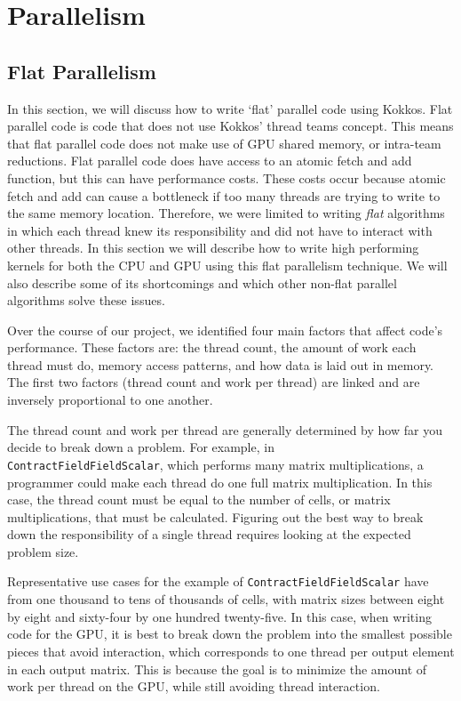\chapter{Parallelism}

\section{Flat Parallelism}
In this section, we will discuss how to write `flat' parallel code using Kokkos. 
Flat parallel code is code that does not use Kokkos' thread teams concept. This means
that flat parallel code does not make use of GPU shared memory, or intra-team reductions.
Flat parallel code does have access to an atomic fetch and add function, 
but this can have performance costs. These costs occur because atomic fetch and add can 
cause a bottleneck if too many threads
are trying to write to the same memory location. Therefore, we were limited to
writing \emph{flat} algorithms in which each thread knew its responsibility and did not
have to interact with other threads. In this section we will describe how to write
high performing kernels for both the CPU and GPU using this flat parallelism
technique. We will also describe some of its shortcomings and which other
non-flat parallel algorithms solve these issues.

Over the course of our project, we identified four main factors that affect
code's performance. These factors are: the thread count, the amount of work
each thread must do, memory access patterns, and how data is laid out in memory.
The first two factors (thread count and work per thread) are linked and are 
inversely proportional to one another. 

The thread count and work per thread are generally determined by how far you
decide to break down a problem. For example, in \\ \texttt{ContractFieldFieldScalar}, which performs
many matrix multiplications, a programmer could make each thread do one full matrix
multiplication. In this case, the thread count must be equal to the number of cells,
or matrix multiplications, that must be calculated. Figuring out the best way
to break down the responsibility of a single thread requires looking at the
expected problem size. 

Representative use cases for the example of
\texttt{ContractFieldFieldScalar} have from one thousand to tens of thousands of cells, with
matrix sizes between eight by eight and sixty-four by one hundred twenty-five. In this case, 
when writing code for the GPU, it
is best to break down the problem into the smallest possible pieces that avoid interaction, which corresponds
to one thread per output element in each output matrix. This is
because the goal is to minimize the amount of work per thread on the GPU, while still
avoiding thread interaction. 

